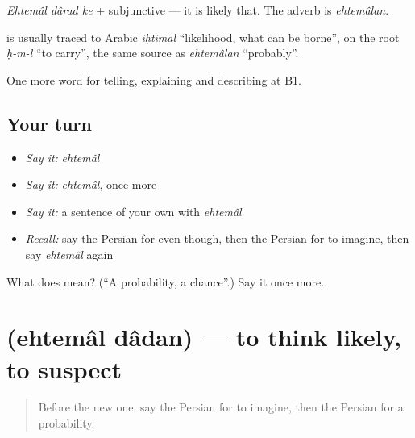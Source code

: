 \emph{Ehtemâl dârad ke} + subjunctive — it is likely that. The adverb is \emph{ehtemâlan}.

\begin{cousinweb}
\textbf{} is usually traced to Arabic \emph{iḥtimāl} \textquotedblleft{}likelihood, what can be borne\textquotedblright{}, on the root \emph{ḥ-m-l} \textquotedblleft{}to carry\textquotedblright{}, the same source as \emph{ehtemâlan} \textquotedblleft{}probably\textquotedblright{}.
\end{cousinweb}

\begin{grammarlens}[title={What you've built}]
One more word for telling, explaining and describing at B1.
\end{grammarlens}

\subsection*{Your turn}
\begin{itemize}
\raggedright
  \item \emph{Say it:} \emph{ehtemâl}
  \item \emph{Say it:} \emph{ehtemâl}, once more
  \item \emph{Say it:} a sentence of your own with \emph{ehtemâl}
  \item \emph{Recall:} say the Persian for even though, then the Persian for to imagine, then say \emph{ehtemâl} again
\end{itemize}

\begin{tcolorbox}[breakable,colback=teal!4,colframe=teal!35!black,title={Before you move on}]
What does  mean? (\textquotedblleft{}A probability, a chance\textquotedblright{}.) Say it once more.
\end{tcolorbox}
\section[\texorpdfstring{\fa{احتمال} \fa{دادن} (ehtemâl dâdan)}{احتمال دادن (ehtemâl dâdan)}]{  (ehtemâl dâdan) — to think likely, to suspect}

\label{lesson:FA-C392-ehtemal-dadan}



\begin{quote}
Before the new one: say the Persian for to imagine, then the Persian for a probability.
\end{quote}

